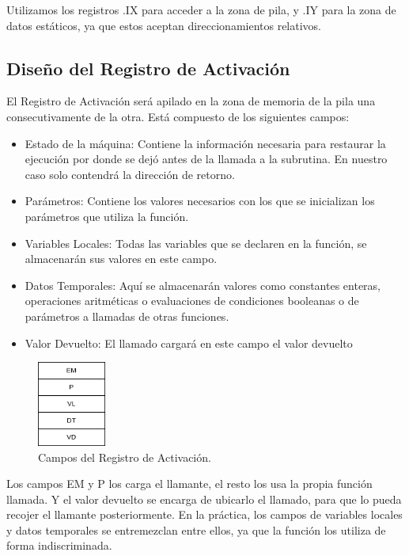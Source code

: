 \documentclass{article}[a4paper]
\begin{document}
Utilizamos los registros .IX para acceder a la zona de pila, y .IY para la zona de datos estáticos, ya que estos aceptan direccionamientos relativos.

\subsection{Diseño del Registro de Activación}

El Registro de Activación será apilado en la zona de memoria de la pila una consecutivamente de la otra. Está compuesto de los siguientes campos:

\begin{itemize}
    \item Estado de la máquina: Contiene la información necesaria para restaurar la ejecución por donde se dejó antes de la llamada a la subrutina. En nuestro caso solo contendrá la dirección de retorno.
    \item Parámetros: Contiene los valores necesarios con los que se inicializan los parámetros que utiliza la función.
    \item Variables Locales: Todas las variables que se declaren en la función, se almacenarán sus valores en este campo.
    \item Datos Temporales: Aquí se almacenarán valores como constantes enteras, operaciones aritméticas o evaluaciones de condiciones booleanas o de parámetros a llamadas de otras funciones. 
    \item Valor Devuelto: El llamado cargará en este campo el valor devuelto 
\end{itemize}

\begin{figure}[h!]
\centering
\includegraphics[width=0.2\textwidth]{RA.png}
\caption{\label{figura:RA}Campos del Registro de Activación.}
\end{figure}

Los campos EM y P los carga el llamante, el resto los usa la propia función llamada. Y el valor devuelto se encarga de ubicarlo el llamado, para que lo pueda recojer el llamante posteriormente. En la práctica, los campos de variables locales y datos temporales se entremezclan entre ellos, ya que la función los utiliza de forma indiscriminada.
\end{document}
